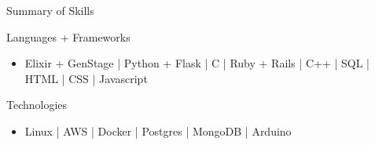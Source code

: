 \documentclass[calibri]{mcdowellcv}
\begin{document}
    \makeheader

    \begin{cvsection}{\Large{Summary of Skills}}
        \begin{cvsubsection}{Languages + Frameworks}{}{}
            \begin{itemize}
                \item Elixir + GenStage | Python + Flask | C | Ruby + Rails | C++ | SQL | HTML | CSS | Javascript
            \end{itemize}
        \end{cvsubsection}
        \begin{cvsubsection}{Technologies}{}{}
            \begin{itemize}
                \item Linux | AWS | Docker | Postgres | MongoDB | Arduino
            \end{itemize}
        \end{cvsubsection}
    \end{cvsection}
\end{document}
